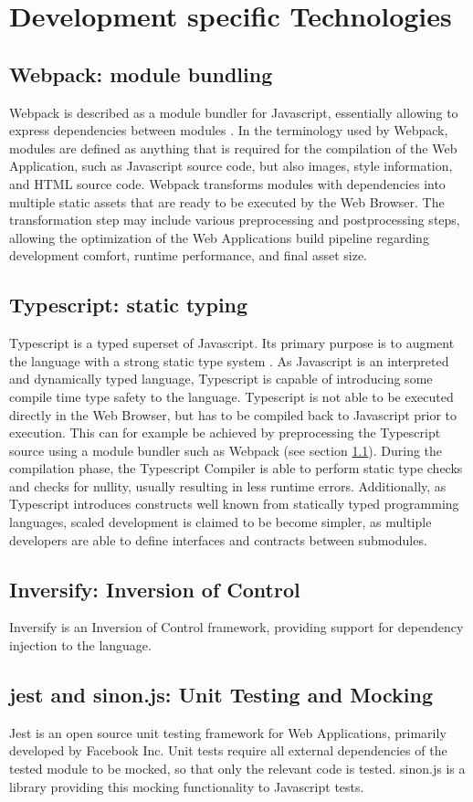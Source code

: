 \section{Development specific Technologies}
\subsection{Webpack: module bundling}
\label{sec:tech-webpack}
Webpack is described as a module bundler for Javascript, essentially allowing to express dependencies between modules \cite{WebpackConcepts}. In the terminology used by Webpack, modules are defined as anything that is required for the compilation of the Web Application, such as Javascript source code, but also images, style information, and HTML source code. Webpack transforms modules with dependencies into multiple static assets that are ready to be executed by the Web Browser. The transformation step may include various preprocessing and postprocessing steps, allowing the optimization of the Web Applications build pipeline regarding development comfort, runtime performance, and final asset size.
\subsection{Typescript: static typing}
Typescript is a typed superset of Javascript. Its primary purpose is to augment the language with a strong static type system \cite{TypescriptUnderstanding}. As Javascript is an interpreted and dynamically typed language, Typescript is capable of introducing some compile time type safety to the language. Typescript is not able to be executed directly in the Web Browser, but has to be compiled back to Javascript prior to execution. This can for example be achieved by preprocessing the Typescript source using a module bundler such as Webpack (see section \ref{sec:tech-webpack}). During the compilation phase, the Typescript Compiler is able to perform static type checks and checks for nullity, usually resulting in less runtime errors. Additionally, as Typescript introduces constructs well known from statically typed programming languages, scaled development is claimed to be become simpler, as multiple developers are able to define interfaces and contracts between submodules. 
\subsection{Inversify: Inversion of Control}
Inversify is an Inversion of Control framework, providing support for dependency injection to the language.
\subsection{jest and sinon.js: Unit Testing and Mocking}
Jest is an open source unit testing framework for Web Applications, primarily developed by Facebook Inc. Unit tests require all external dependencies of the tested module to be mocked, so that only the relevant code is tested. sinon.js is a library providing this mocking functionality to Javascript tests.
